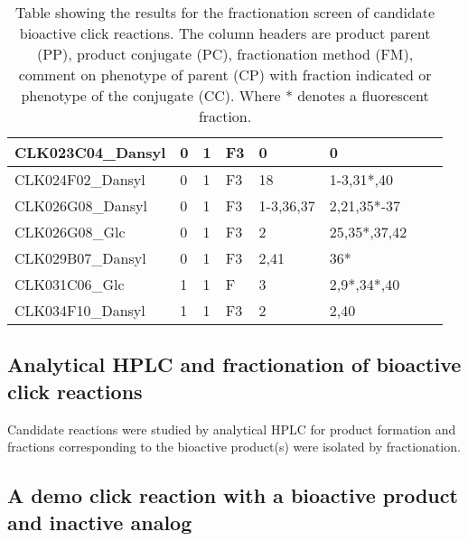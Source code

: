 \begin{table}
\begin{tabular}{|l|l|l|l|l|l|l|l|}
    CLK023C04\_Dansyl & 0                & 1                   & F3             & 0                 & 0
\\ \hline
    CLK024F02\_Dansyl & 0                & 1                   & F3             & 18                & 1-3,31*,40  \\ \hline
    CLK026G08\_Dansyl & 0                & 1                   & F3             & 1-3,36,37         & 2,21,35*-37 \\ \hline
    CLK026G08\_Glc    & 0                & 1                   & F3             & 2                 & 25,35*,37,42 \\ \hline
    CLK029B07\_Dansyl & 0                & 1                   & F3             & 2,41                 & 36* 
\\ \hline
    CLK031C06\_Glc    & 1                & 1                   & F              & 3                 & 2,9*,34*,40 \\ \hline
    CLK034F10\_Dansyl & 1                & 1                   & F3             & 2                 & 2,40 
\\ \hline
   \end{tabular}
   \caption {Table showing the results for the fractionation screen of candidate bioactive click reactions. The column headers are product parent (PP), product conjugate (PC), fractionation method (FM), comment on phenotype of parent (CP) with fraction indicated or phenotype of the conjugate (CC). Where * denotes a fluorescent fraction.}
\label{table:FractionationOverviewZ}
\end{table}





\subsection{Analytical HPLC and fractionation of bioactive click reactions}

Candidate reactions were studied by analytical HPLC for product formation and fractions corresponding to the bioactive product(s) were isolated by fractionation.

%



\subsection{A demo click reaction with a bioactive product and inactive analog}

